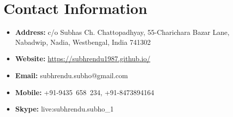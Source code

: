 \documentclass{article}
\begin{document}
 
\begin{center}
	\Large{\bf \name}
\end{center}
%                                  

 \noindent\makebox[\linewidth]{\rule{\textwidth}{0.4pt}}
\section{Contact Information}
	\begin{itemize}
		\item {\bf Address:} c/o Subhas Ch. Chattopadhyay, 55-Charichara Bazar Lane, Nabadwip, Nadia, Westbengal, India 741302
		\item {\bf Website:} \url{https://subhrendu1987.github.io/}
		\item {\bf Email:} subhrendu.subho@gmail.com
		\item {\bf Mobile:} +91-9435~658~234, +91-8473894164
		\item {\bf Skype:} live:subhrendu.subho\_1
	\end{itemize}
\end{document}
